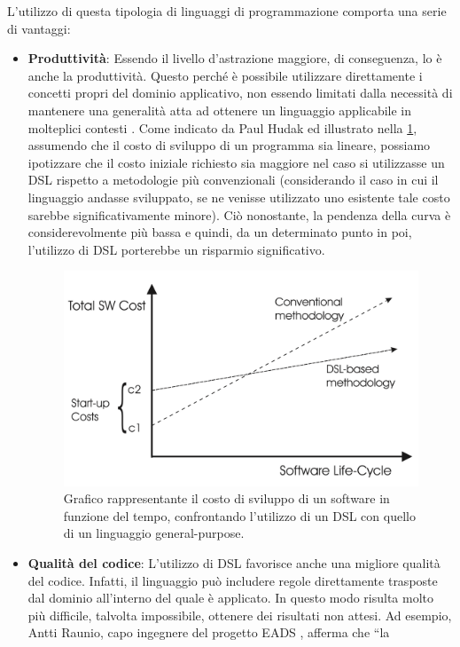 \documentclass[12pt,a4paper,openright,twoside]{book}
\begin{document}
L’utilizzo di questa tipologia di linguaggi di programmazione comporta una serie di vantaggi:
\begin{itemize}
    \item \textbf{Produttività}: Essendo il livello d’astrazione maggiore, di conseguenza, lo è anche la produttività. Questo perché è 
    possibile utilizzare direttamente i concetti propri del dominio applicativo, non essendo limitati dalla necessità di mantenere una 
    generalità atta ad ottenere un linguaggio applicabile in molteplici contesti  \cite{Kelly2008}. Come indicato da Paul Hudak 
    \cite{Hudak1997} ed illustrato nella \cref{fig:sw-dev-cost}, assumendo che il costo di sviluppo di un programma sia lineare, possiamo 
    ipotizzare che il costo iniziale richiesto sia maggiore nel caso si utilizzasse un \ac{DSL} rispetto a metodologie più convenzionali 
    (considerando il caso in cui il linguaggio andasse sviluppato, se ne venisse utilizzato uno esistente tale costo sarebbe significativamente 
    minore). Ciò nonostante, la pendenza della curva è considerevolmente più bassa e quindi, da un determinato punto in poi, l’utilizzo di 
    \ac{DSL} porterebbe un risparmio significativo.
    \begin{figure}[H]
        \centering
        \includegraphics[width=.8\linewidth]{figures/sw-dev-cost.pdf}
        \caption{Grafico rappresentante il costo di sviluppo di un software in funzione del tempo, confrontando l'utilizzo di un DSL con 
        quello di un linguaggio general-purpose.}
        \label{fig:sw-dev-cost}
    \end{figure}
    \item \textbf{Qualità del codice}: L'utilizzo di \ac{DSL} favorisce anche una migliore qualità del codice. Infatti, il linguaggio può 
    includere regole direttamente trasposte dal dominio all'interno del quale è applicato. In questo modo risulta molto più difficile, talvolta 
    impossibile, ottenere dei risultati non attesi. Ad esempio, Antti Raunio, capo ingegnere del progetto EADS \cite{EADS}, afferma che ``la 

\end{itemize}
\end{document}

